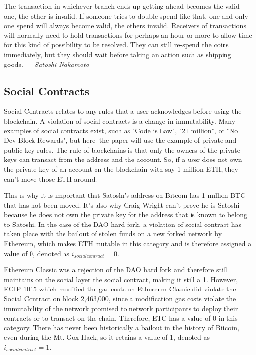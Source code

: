 \documentclass{article}
\begin{document}
\begin{displayquote}
The transaction in whichever branch ends up getting ahead becomes the valid one, the other is invalid. If someone tries to double spend like that, one and only one spend will always become valid, the others invalid. Receivers of transactions will normally need to hold transactions for perhaps an hour or more to allow time for this kind of possibility to be resolved. They can still re-spend the coins immediately, but they should wait before taking an action such as shipping goods. — \textit{Satoshi Nakamoto}
\end{displayquote}

\subsection{Social Contracts}

Social Contracts relates to any rules that a user acknowledges before using the blockchain. A violation of social contracts is a change in immutability. Many examples of social contracts exist, such as "Code is Law", "21 million", or "No Dev Block Rewards", but here, the paper will use the example of private and public key rules. The rule of blockchains is that only the owners of the private keys can transact from the address and the account. So, if a user does not own the private key of an account on the blockchain with say 1 million ETH, they can’t move those ETH around.

This is why it is important that Satoshi’s address on Bitcoin has 1 million BTC that has not been moved. It’s also why Craig Wright can’t prove he is Satoshi because he does not own the private key for the address that is known to belong to Satoshi. In the case of the DAO hard fork, a violation of social contract has taken place with the bailout of stolen funds on a new forked network by Ethereum, which makes ETH mutable in this category and is therefore assigned a value of 0, denoted as $i_{social contract} = 0$.

Ethereum Classic was a rejection of the DAO hard fork and therefore still maintains on the social layer the social contract, making it still a 1. However, ECIP-1015\cite{ecip1015} which modified the gas costs on Ethereum Classic did violate the Social Contract on block 2,463,000, since a modification gas costs violate the immutability of the network promised to network participants to deploy their contracts or to transact on the chain. Therefore, ETC has a value of 0 in this category. There has never been historically a bailout in the history of Bitcoin, even during the Mt. Gox Hack, so it retains a value of 1, denoted as $i_{social contract} = 1$.
\end{document}
